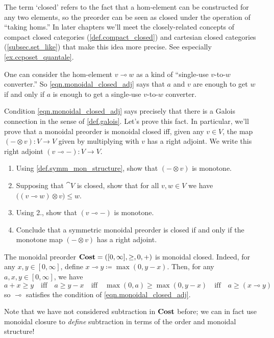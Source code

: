 \documentclass[7Sketches]{subfiles}
\begin{document}
\begin{remark}%
\label{rem.language_one_time}
The term `closed' refers to the fact that a hom-element can be constructed for any two elements, so the preorder can be seen as closed under the operation of ``taking
homs.'' In later chapters we'll meet the closely-related concepts of compact closed
categories (\cref{def.compact_closed}) and cartesian closed categories
(\cref{subsec.set_like}) that make this idea more precise. See especially \cref{ex.ccposet_quantale}.

One can consider the hom-element $v\multimap w$ as a kind of ``single-use
$v$-to-$w$ converter.'' So \cref{eqn.monoidal_closed_adj} says that $a$ and $v$
are enough to get $w$ if and only if $a$ is enough to get a single-use $v$-to-$w$ converter.
\end{remark}

\begin{exercise} %
\label{exc.closure_is_adj} %
Condition \cref{eqn.monoidal_closed_adj} says precisely that there is a Galois
connection in the sense of \cref{def.galois}. Let's prove this fact. In
particular, we'll prove that a monoidal preorder is monoidal closed iff, given
any $v\in V$, the map $(-\otimes v)\colon V \to V$ given by multiplying with $v$
has a right adjoint. We write this right adjoint $(v \multimap -)\colon V \to V$.
\begin{enumerate}
\item Using \cref{def.symm_mon_structure}, show that $(-\otimes v)$ is monotone.
\item Supposing that $\cat{V}$ is closed, show that for all $v,w \in V$ we have $\big((v \multimap w) \otimes v\big) \le w$.
\item Using 2., show that $(v \multimap -)$ is monotone.
\item Conclude that a symmetric monoidal preorder is closed if and only if the
monotone map $(-\otimes v)$ has a right adjoint. \qedhere
\end{enumerate}
\end{exercise}

\begin{example}%
\label{ex.Lawv_closed}%
%
The monoidal preorder $\mathbf{Cost}=([0,\infty],\geq,0,+)$ is monoidal closed. Indeed, for any $x,y\in[0,\infty]$, define $x\multimap y\coloneqq\max(0,y-x)$. Then, for any $a,x,y\in[0,\infty]$, we have
\[
	a+x\geq y
	\quad\text{iff}\quad
	a\geq y-x
	\quad\text{iff}\quad
	\max(0,a)\geq\max(0,y-x)
	\quad\text{iff}\quad
	a\geq (x\multimap y)	
\]
so $\multimap$ satisfies the condition of \cref{eqn.monoidal_closed_adj}. 

Note that we have not considered subtraction in $\mathbf{Cost}$ before; we can in fact
use monoidal closure to \emph{define} subtraction in terms of the order and
monoidal structure!
\end{example}
\end{document}
